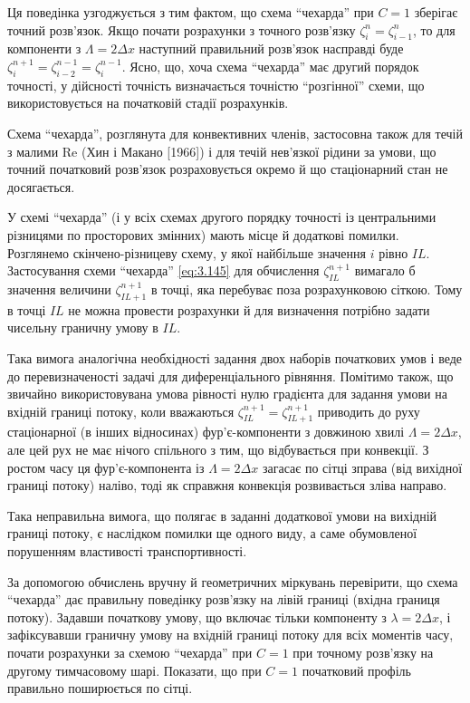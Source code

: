 Ця поведінка узгоджується з тим фактом, що схема ``чехарда'' при $C = 1$ зберігає точний розв'язок. Якщо почати розрахунки з точного розв'язку $\zeta_i^n = \zeta_{i - 1}^n$, то для компоненти з $\Lambda = 2 \Delta x$ наступний правильний розв'язок насправді буде $\zeta_i^{n + 1} = \zeta_{i - 2}^{n - 1} = \zeta_i^{n - 1}$. Ясно, що, хоча схема ``чехарда'' має другий порядок точності, у дійсності точність визначається точністю ``розгінної'' схеми, що використовується на початковій стадії розрахунків. \medskip

Схема ``чехарда'', розглянута для конвективних членів, застосовна також для течій з малими $\text{Re}$ (Хин і Макано [1966]) і для течій нев'язкої рідини за умови, що точний початковий розв'язок розраховується окремо й що стаціонарний стан не досягається. \medskip

У схемі ``чехарда'' (і у всіх схемах другого порядку точності із центральними різницями по просторових змінних) мають місце й додаткові помилки. Розглянемо скінчено-різницеву схему, у якої найбільше значення $i$ рівно $IL$. Застосування схеми ``чехарда'' \eqref{eq:3.145} для обчислення $\zeta_{IL}^{n + 1}$  вимагало б значення величини $\zeta_{IL + 1}^{n + 1}$ в точці, яка перебуває поза розрахунковою сіткою. Тому в точці $IL$ не можна провести розрахунки й для визначення потрібно задати чисельну граничну умову в $IL$. \medskip

Така вимога аналогічна необхідності задання двох наборів початкових умов і веде до перевизначеності задачі для диференціального рівняння. Помітимо також, що звичайно використовувана умова рівності нулю градієнта для задання умови на вхідній границі потоку, коли вважаються $\zeta_{IL}^{n + 1} = \zeta_{IL + 1}^{n + 1}$ приводить до руху стаціонарної (в інших відносинах) фур'є-компоненти з довжиною хвилі $\Lambda = 2 \Delta x$, але цей рух не має нічого спільного з тим, що відбувається при конвекції. З ростом часу ця фур'є-компонента із $\Lambda = 2 \Delta x$ загасає по сітці зправа (від вихідної границі потоку) наліво, тоді як справжня конвекція розвивається зліва направо. \medskip

Така неправильна вимога, що полягає в заданні додаткової умови на вихідній границі потоку, є наслідком помилки ще одного виду, а саме обумовленої порушенням властивості транспортивності. \medskip

\begin{exercise}
    За допомогою обчислень вручну й геометричних міркувань перевірити, що схема ``чехарда'' дає правильну поведінку розв'язку на лівій границі (вхідна границя потоку). Задавши початкову умову, що включає тільки компоненту з $\lambda = 2 \Delta x$, і зафіксувавши граничну умову на вхідній границі потоку для всіх моментів часу, почати розрахунки за схемою ``чехарда'' при $C = 1$ при точному розв'язку на другому тимчасовому шарі. Показати, що при $C = 1$ початковий профіль правильно поширюється по сітці.
\end{exercise}

